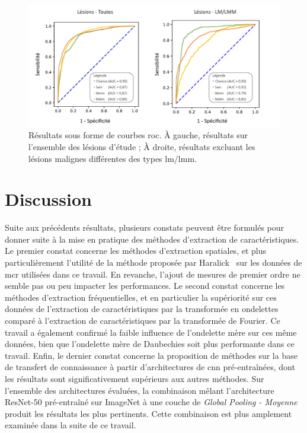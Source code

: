 \begin{figure}[H]
    \centering
    \includegraphics[width=\textwidth]{contents/chapter_5/resources/results_image_classification_roc.pdf}
    \caption{Résultats sous forme de courbes \gls{roc}. À gauche, résultats sur l'ensemble des lésions d'étude ; À droite, résultats excluant les lésions malignes différentes des types \gls{lm}/\gls{lmm}.}
    \label{fig:results_image_classification_roc}
\end{figure}\par

\section{Discussion}
Suite aux précédents résultats, plusieurs constats peuvent être formulés pour donner suite à la mise en pratique des méthodes d'extraction de caractéristiques. Le premier constat concerne les méthodes d'extraction spatiales, et plus particulièrement l'utilité de la méthode proposée par Haralick~ sur les données de \gls{mcr} utilisées dans ce travail. En revanche, l'ajout de mesures de premier ordre ne semble pas ou peu impacter les performances. Le second constat concerne les méthodes d'extraction fréquentielles, et en particulier la supériorité sur ces données de l'extraction de caractéristiques par la transformée en ondelettes comparé à l'extraction de caractéristiques par la transformée de Fourier. Ce travail a également confirmé la faible influence de l'ondelette mère sur ces même données, bien que l'ondelette mère de Daubechies soit plus performante dans ce travail. Enfin, le dernier constat concerne la proposition de méthodes sur la base de transfert de connaissance à partir d'architectures de \gls{cnn} pré-entraînées, dont les résultats sont significativement supérieurs aux autres méthodes. Sur l'ensemble des architectures évaluées, la combinaison mêlant l'architecture ResNet-50 pré-entraîné sur ImageNet à une couche de \textit{Global Pooling - Moyenne} produit les résultats les plus pertinents. Cette combinaison est plus amplement examinée dans la suite de ce travail.\par

